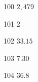 \begin{loigiaibt}{100}
 $2{,}479$
\end{loigiaibt}
\begin{loigiaibt}{101}
 2
\end{loigiaibt}
\begin{loigiaibt}{102}
 $33.15$
\end{loigiaibt}
\begin{loigiaibt}{103}
 $7.30$
\end{loigiaibt}
\begin{loigiaibt}{104}
 $36.8$
\end{loigiaibt}
